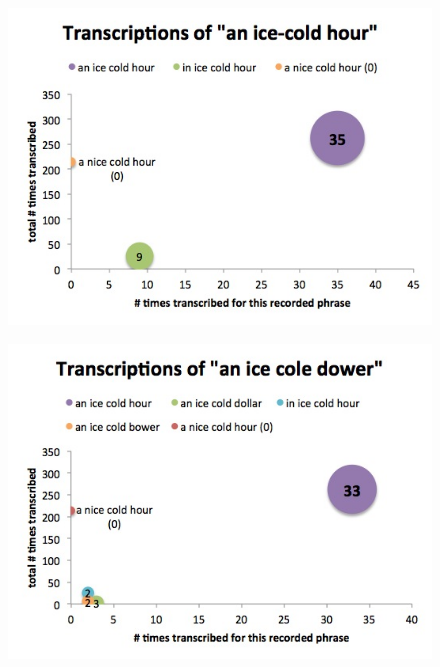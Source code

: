 \begin{figure}[h]
\begin{center}
\includegraphics[width=\piechartwidth]{bubbleChartTranscriptionFrequency_anIce-ColdHour.jpg}
\captionfonts
\caption[Most common transcriptions for the recorded phrase "an Ice-Cold Hour"]{}
\label{bubbleChart:anIce-ColdHour}
\end{center}
\end{figure}

\begin{figure}[h]
\begin{center}
\includegraphics[width=\piechartwidth]{bubbleChartTranscriptionFrequency_anIceColeDower.jpg}
\captionfonts
\caption[Most common transcriptions for the recorded phrase "anIceColeDower"]{}
\label{bubbleChart:anIceColeDower}
\end{center}
\end{figure}

